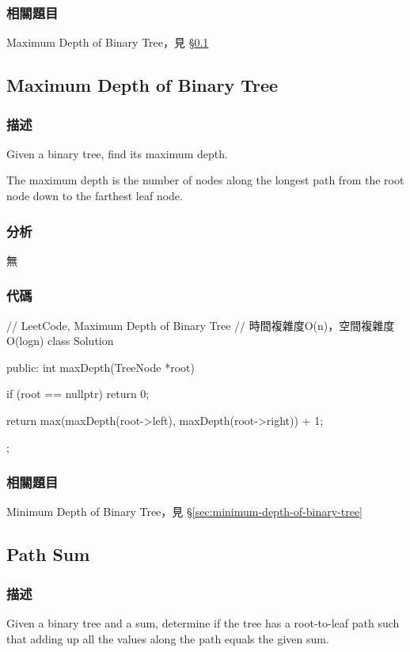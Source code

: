 \subsubsection{相關題目}
\begindot
\item Maximum Depth of Binary Tree，見 \S \ref{sec:maximum-depth-of-binary-tree}
\myenddot


\subsection{Maximum Depth of Binary Tree}
\label{sec:maximum-depth-of-binary-tree}


\subsubsection{描述}
Given a binary tree, find its maximum depth.

The maximum depth is the number of nodes along the longest path from the root node down to the farthest leaf node.


\subsubsection{分析}
無

\subsubsection{代碼}

\begin{Code}
// LeetCode, Maximum Depth of Binary Tree
// 時間複雜度O(n)，空間複雜度O(logn)
class Solution {
public:
    int maxDepth(TreeNode *root) {
        if (root == nullptr) return 0;

        return max(maxDepth(root->left), maxDepth(root->right)) + 1;
    }
};
\end{Code}


\subsubsection{相關題目}
\begindot
\item Minimum Depth of Binary Tree，見 \S \ref{sec:minimum-depth-of-binary-tree}
\myenddot


\subsection{Path Sum}
\label{sec:path-sum}


\subsubsection{描述}
Given a binary tree and a sum, determine if the tree has a root-to-leaf path such that adding up all the values along the path equals the given sum.

